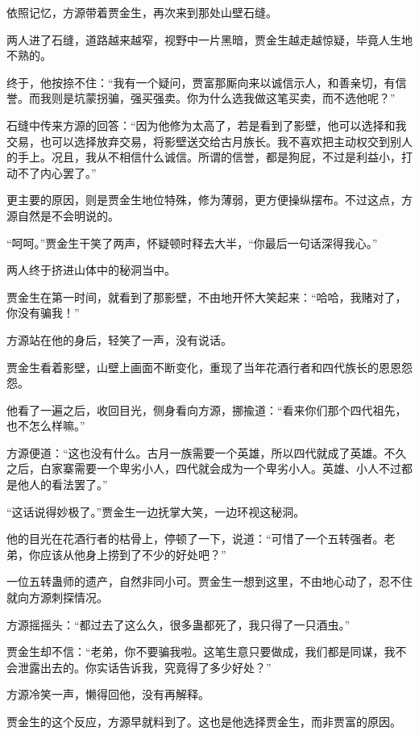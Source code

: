 
\begin{this_body}

依照记忆，方源带着贾金生，再次来到那处山壁石缝。

两人进了石缝，道路越来越窄，视野中一片黑暗，贾金生越走越惊疑，毕竟人生地不熟的。

终于，他按捺不住：“我有一个疑问，贾富那厮向来以诚信示人，和善亲切，有信誉。而我则是坑蒙拐骗，强买强卖。你为什么选我做这笔买卖，而不选他呢？”

石缝中传来方源的回答：“因为他修为太高了，若是看到了影壁，他可以选择和我交易，也可以选择放弃交易，将影壁送交给古月族长。我不喜欢把主动权交到别人的手上。况且，我从不相信什么诚信。所谓的信誉，都是狗屁，不过是利益小，打动不了内心罢了。”

更主要的原因，则是贾金生地位特殊，修为薄弱，更方便操纵摆布。不过这点，方源自然是不会明说的。

“呵呵。”贾金生干笑了两声，怀疑顿时释去大半，“你最后一句话深得我心。”

两人终于挤进山体中的秘洞当中。

贾金生在第一时间，就看到了那影壁，不由地开怀大笑起来：“哈哈，我赌对了，你没有骗我！”

方源站在他的身后，轻笑了一声，没有说话。

贾金生看着影壁，山壁上画面不断变化，重现了当年花酒行者和四代族长的恩恩怨怨。

他看了一遍之后，收回目光，侧身看向方源，挪揄道：“看来你们那个四代祖先，也不怎么样嘛。”

方源便道：“这也没有什么。古月一族需要一个英雄，所以四代就成了英雄。不久之后，白家寨需要一个卑劣小人，四代就会成为一个卑劣小人。英雄、小人不过都是他人的看法罢了。”

“这话说得妙极了。”贾金生一边抚掌大笑，一边环视这秘洞。

他的目光在花酒行者的枯骨上，停顿了一下，说道：“可惜了一个五转强者。老弟，你应该从他身上捞到了不少的好处吧？”

一位五转蛊师的遗产，自然非同小可。贾金生一想到这里，不由地心动了，忍不住就向方源刺探情况。

方源摇摇头：“都过去了这么久，很多蛊都死了，我只得了一只酒虫。”

贾金生却不信：“老弟，你不要骗我啦。这笔生意只要做成，我们都是同谋，我不会泄露出去的。你实话告诉我，究竟得了多少好处？”

方源冷笑一声，懒得回他，没有再解释。

贾金生的这个反应，方源早就料到了。这也是他选择贾金生，而非贾富的原因。


\end{this_body}
